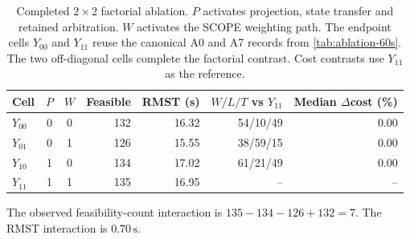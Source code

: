 \begin{table}[H]
  \centering
  \caption{Completed $2\times2$ factorial ablation. $P$ activates projection, state transfer and retained arbitration. $W$ activates the SCOPE weighting path. The endpoint cells $Y_{00}$ and $Y_{11}$ reuse the canonical A0 and A7 records from \cref{tab:ablation-60s}. The two off-diagonal cells complete the factorial contrast. Cost contrasts use $Y_{11}$ as the reference.}
  \label{tab:ablation-factorial-60s}
  \scriptsize
  \begin{tabular*}{\linewidth}{@{\extracolsep{\fill}}lccrrrr@{}}
    \toprule
    Cell & $P$ & $W$ & Feasible & RMST (s) & $W/L/T$ vs $Y_{11}$ & Median $\Delta$cost (\%) \\
    \midrule
    $Y_{00}$ & 0 & 0 & 132 & 16.32 & 54/10/49 & 0.00 \\
    $Y_{01}$ & 0 & 1 & 126 & 15.55 & 38/59/15 & 0.00 \\
    $Y_{10}$ & 1 & 0 & 134 & 17.02 & 61/21/49 & 0.00 \\
    $Y_{11}$ & 1 & 1 & 135 & 16.95 & -- & -- \\
    \bottomrule
  \end{tabular*}
  \vspace{0.35em}
  \raggedright\footnotesize The observed feasibility-count interaction is $135-134-126+132=7$. The RMST interaction is $0.70\,\mathrm{s}$.
\end{table}
